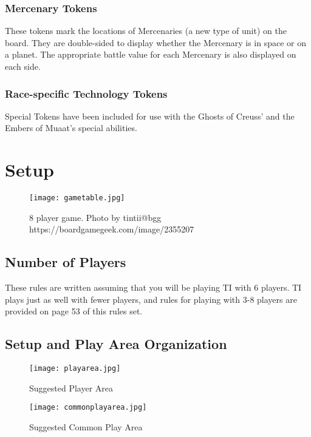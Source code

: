\documentclass[11pt,fleqn]{book} %
\begin{document}
\begin{STbox}
\subsection{Mercenary Tokens }
These tokens mark the locations of Mercenaries (a new type of unit) on the board. They are double-sided to display whether the Mercenary is in space or on a planet. The appropriate battle value for each Mercenary is also displayed on each side.

\subsection{Race-specific Technology Tokens }
Special Tokens have been included for use with the Ghosts of Creuss’ and the Embers of Muaat’s special abilities.

\end{STbox}
\chapter{Setup}
\begin{figure}[h!]
    \centering
    \texttt{[image: gametable.jpg]}\\
    \caption{8 player game. Photo by tintii@bgg https://boardgamegeek.com/image/2355207}
    \label{fig:game_table}
\end{figure}

\section{Number of Players}
These rules are written assuming that you will be playing TI with 6 players. TI plays just as well with
fewer players, and rules for playing with 3-8 players are provided on page 53 of this rules set.


\section{Setup and Play Area Organization}

\begin{figure}[!h!]
    \centering
    \texttt{[image: playarea.jpg]}\\
    \caption{Suggested Player Area}
    \label{fig:play area}
\end{figure}

\begin{figure}[!h!]
    \centering
    \texttt{[image: commonplayarea.jpg]}
    \caption{Suggested Common Play Area}
    \label{fig:play area}
\end{figure}
\end{document}
